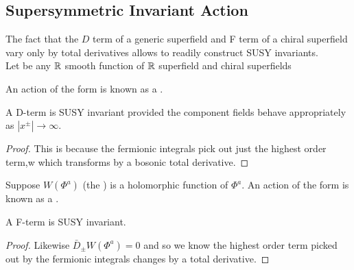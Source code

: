\documentclass{article}
\begin{document}
\subsection{Supersymmetric Invariant Action}
The fact that the $D$ term of a generic superfield and F term of a chiral superfield vary only by total derivatives allows to readily construct SUSY invariants. \\
Let 
be any $\mathbb{R}$ smooth  function of $\mathbb{R}$ superfield
and chiral superfields 
\begin{definition}
An action of the form 
is known as a .
\end{definition}
\begin{prop}
	A D-term is SUSY invariant provided the component fields behave appropriately as $|x^\pm|\to \infty$.
\end{prop}
\begin{proof}
	This is because the fermionic integrals pick out just the highest order term,w which transforms by a bosonic total derivative.
\end{proof}

\begin{definition}
Suppose $W(\Phi^a)$ (the ) is a holomorphic function of $\Phi^a$. An action of the form 
	is known as a .
\end{definition}

\begin{prop}
	A F-term is SUSY invariant.
\end{prop}
\begin{proof}
Likewise $\bar{D}_\pm W(\Phi^a) = 0$ and so we know the highest order term picked out by the fermionic integrals changes by a total derivative.
\end{proof}
\end{document}
